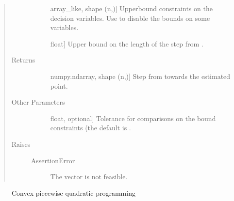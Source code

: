 \documentclass[letterpaper,10pt,english]{sphinxmanual}
\begin{document}
\begin{fulllineitems}
\begin{quote}
\begin{description}
\begin{description}
\item[{}] \leavevmode{[}array\_like, shape (n,){]}
\sphinxAtStartPar
Upper\sphinxhyphen{}bound constraints on the decision variables. Use  to
disable the bounds on some variables.

\item[{}] \leavevmode{[}float{]}
\sphinxAtStartPar
Upper bound on the length of the step from .

\end{description}

\item[{Returns}] \leavevmode\begin{description}
\item[{}] \leavevmode{[}numpy.ndarray, shape (n,){]}
\sphinxAtStartPar
Step from  towards the estimated point.

\end{description}

\item[{Other Parameters}] \leavevmode\begin{description}
\item[{}] \leavevmode{[}float, optional{]}
\sphinxAtStartPar
Tolerance for comparisons on the bound constraints (the default is
.

\end{description}

\item[{Raises}] \leavevmode\begin{description}
\item[{AssertionError}] \leavevmode
\sphinxAtStartPar
The vector  is not feasible.

\end{description}

\end{description}\end{quote}


\nopagebreak

\begin{description}
\item[{{\hyperref[\detokenize{refs/generated/cobyqa.linalg.cpqp:cobyqa.linalg.cpqp}]{}}}] \leavevmode
\sphinxAtStartPar
Convex piecewise quadratic programming


\end{description}
\end{fulllineitems}
\end{document}
